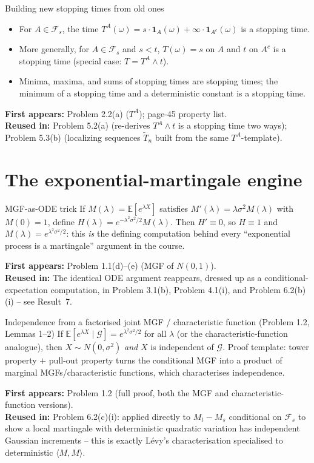\documentclass[11pt]{article}
\newcommand{\E}{\mathbb{E}}
\newcommand{\F}{\mathcal F}
\newcommand{\br}[1]{\langle #1\rangle}
\newcommand{\used}[2]{\begin{sourcebox}\textbf{First appears:} #1 \\ \textbf{Reused in:} #2\end{sourcebox}}
\begin{document}
\begin{result}{Building new stopping times from old ones}
\label{res:3}
\begin{itemize}
\item For $A\in\F_s$, the time $T^A(\omega)=s\cdot\mathbf 1_A(\omega)+\infty\cdot
\mathbf 1_{A^c}(\omega)$ is a stopping time.
\item More generally, for $A\in\F_s$ and $s<t$, $T(\omega)=s$ on $A$ and $t$ on
$A^c$ is a stopping time (special case: $T=T^A\wedge t$).
\item Minima, maxima, and sums of stopping times are stopping times; the minimum
of a stopping time and a deterministic constant is a stopping time.
\end{itemize}
\end{result}
\used{Problem 2.2(a) ($T^A$); page-45 property list.}{Problem 5.2(a) (re-derives
$T^A\wedge t$ is a stopping time two ways); Problem 5.3(b) (localizing sequences
$\tilde T_n$ built from the same $T^A$-template).}

\section{The exponential-martingale engine}

\begin{result}{MGF-as-ODE trick}
\label{res:4}
If $M(\lambda)=\E[e^{\lambda X}]$ satisfies $M'(\lambda)=\lambda\sigma^2 M(\lambda)$
with $M(0)=1$, define $H(\lambda)=e^{-\lambda^2\sigma^2/2}M(\lambda)$. Then
$H'\equiv0$, so $H\equiv1$ and $M(\lambda)=e^{\lambda^2\sigma^2/2}$: this
\emph{is} the defining computation behind every ``exponential process is a
martingale'' argument in the course.
\end{result}
\used{Problem 1.1(d)--(e) (MGF of $N(0,1)$).}{The identical ODE argument reappears,
dressed up as a conditional-expectation computation, in Problem 3.1(b), Problem
4.1(i), and Problem 6.2(b)(i) -- see Result~7.}

\begin{result}{Independence from a factorised joint MGF / characteristic function
(Problem 1.2, Lemmas 1--2)}
\label{res:5}
If $\E[e^{\lambda X}\mid\mathcal G]=e^{\lambda^2\sigma^2/2}$ for all $\lambda$ (or
the characteristic-function analogue), then $X\sim N(0,\sigma^2)$ \emph{and} $X$
is independent of $\mathcal G$. Proof template: tower property $+$ pull-out
property turns the conditional MGF into a product of marginal MGFs/characteristic
functions, which characterises independence.
\end{result}
\used{Problem 1.2 (full proof, both the MGF and characteristic-function
versions).}{Problem 6.2(c)(i): applied directly to $M_t-M_s$ conditional on
$\F_s$ to show a local martingale with deterministic quadratic variation has
independent Gaussian increments -- this is exactly Lévy's characterisation
specialised to deterministic $\br{M,M}$.}
\end{document}
